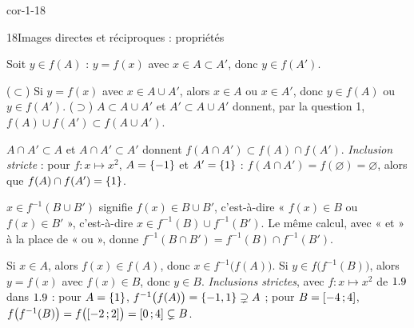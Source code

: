 \begin{blocLivre}{cor-1-18}
\begin{corrige}{18}{Images directes et réciproques : propriétés}
\begin{questions}
  \item Soit $y\in f(A)$ : $y=f(x)$ avec $x\in A\subset A'$, donc $y\in f(A')$.
  \item ($\subset$) Si $y=f(x)$ avec $x\in A\cup A'$, alors $x\in A$ ou $x\in A'$, donc $y\in f(A)$ ou
    $y\in f(A')$. ($\supset$) $A\subset A\cup A'$ et $A'\subset A\cup A'$ donnent, par la question 1,
    $f(A)\cup f(A')\subset f(A\cup A')$.
  \item $A\cap A'\subset A$ et $A\cap A'\subset A'$ donnent $f(A\cap A')\subset f(A)\cap f(A')$.
    \emph{Inclusion stricte} : pour $f:x\mapsto x^{2}$, $A=\left\{-1\right\}$ et $A'=\left\{1\right\}$ :
    $f(A\cap A')=f(\varnothing)=\varnothing$, alors que $f(A)\cap f(A')=\left\{1\right\}$.
  \item $x\in f^{-1}(B\cup B')$ signifie $f(x)\in B\cup B'$, c'est-à-dire « $f(x)\in B$ ou
    $f(x)\in B'$ », c'est-à-dire $x\in f^{-1}(B)\cup f^{-1}(B')$. Le même calcul, avec « et » à la
    place de « ou », donne $f^{-1}(B\cap B')=f^{-1}(B)\cap f^{-1}(B')$.
  \item Si $x\in A$, alors $f(x)\in f(A)$, donc $x\in f^{-1}\bigl(f(A)\bigr)$. Si
    $y\in f\bigl(f^{-1}(B)\bigr)$, alors $y=f(x)$ avec $f(x)\in B$, donc $y\in B$.
    \emph{Inclusions strictes}, avec $f:x\mapsto x^{2}$ de $1.9$ dans $1.9$ : pour $A=\left\{1\right\}$,
    $f^{-1}\bigl(f(A)\bigr)=\left\{-1,1\right\}\supsetneq A$ ; pour $B=\mathopen{[}-4\,{;}\,4\mathclose{]}$,
    $f\bigl(f^{-1}(B)\bigr)=f\bigl(\mathopen{[}-2\,{;}\,2\mathclose{]}\bigr)=\mathopen{[}0\,{;}\,4\mathclose{]}\subsetneq B$.
\end{questions}
\end{corrige}
\end{blocLivre}

